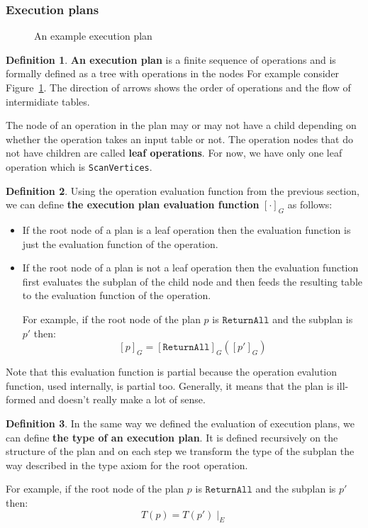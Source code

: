 \documentclass[14pt]{constructor-thesis}
\theoremstyle{definition}
\newtheorem*{definition}{Definition}
\begin{document}
\subsubsection{Execution plans}

\begin{figure}
  \centering
  
  \caption{An example execution plan}
  \label{fig:example-execution-plan}
\end{figure}

\begin{definition}
  \textbf{An execution plan} is a finite sequence of operations and is formally defined as a tree with operations in the nodes For example consider Figure~\ref{fig:example-execution-plan}. The direction of arrows shows the order of operations and the flow of intermidiate tables.

  The node of an operation in the plan may or may not have a child depending on whether the operation takes an input table or not. The operation nodes that do not have children are called \textbf{leaf operations}. For now, we have only one leaf operation which is \texttt{ScanVertices}.
\end{definition}

\begin{definition}
  Using the operation evaluation function from the previous section, we can define \textbf{the execution plan evaluation function} $[\cdot]_G$ as follows:
  \begin{itemize}
    \item If the root node of a plan is a leaf operation then the evaluation function is just the evaluation function of the operation.
    \item If the root node of a plan is not a leaf operation then the evaluation function first evaluates the subplan of the child node and then feeds the resulting table to the evaluation function of the operation.

    For example, if the root node of the plan $p$ is $\texttt{ReturnAll}$ and the subplan is $p'$ then:
    $$ [p]_G = [\texttt{ReturnAll}]_G ([p']_G) $$
  \end{itemize}
\end{definition}

Note that this evaluation function is partial because the operation evalution function, used internally, is partial too. Generally, it means that the plan is ill-formed and doesn't really make a lot of sense.

\begin{definition}
  In the same way we defined the evaluation of execution plans, we can define \textbf{the type of an execution plan}. It is defined recursively on the structure of the plan and on each step we transform the type of the subplan the way described in the type axiom for the root operation.
  
  For example, if the root node of the plan $p$ is $\texttt{ReturnAll}$ and the subplan is $p'$ then:
    $$ T(p) = T(p') \mid_E $$
\end{definition}
\end{document}
